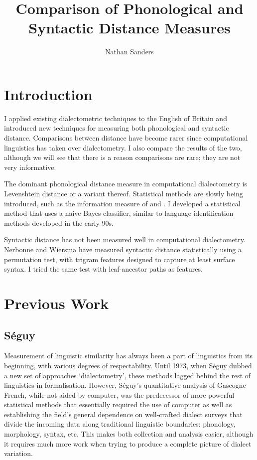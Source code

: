 \documentclass[11pt]{article}
\title{Comparison of Phonological and Syntactic Distance Measures}
\author{Nathan Sanders}
\begin{document}
\maketitle
\section{Introduction}

I applied existing dialectometric techniques to the English of Britain
and introduced new techniques for measuring both phonological and
syntactic distance. Comparisons between distance have become rarer
since computational linguistics has taken over dialectometry. I also
compare the results of the two, although we will see that there is a
reason comparisons are rare; they are not very informative.

The dominant phonological distance measure in computational
dialectometry is Levenshtein distance or a variant
thereof. Statistical methods are slowly being introduced, such as the
information measure of \cite{hinrichs07} and \cite{sanders08}.
I developed a statistical method that uses a naive Bayes
classifier, similar to language identification methods developed in
the early 90s.

Syntactic distance has not been measured well in computational
dialectometry. Nerbonne and Wiersma have measured syntactic distance
statistically using a permutation test, with trigram features designed
to capture at least surface syntax. I tried the same test with
leaf-ancestor paths as features.

\section{Previous Work}
\subsection{S\'eguy}
Measurement of linguistic similarity has always been a part of
linguistics from its beginning, with various degrees of
respectability. Until 1973, when S\'eguy dubbed a new set of
approaches `dialectometry', these methods lagged behind the rest of
linguistics in formalisation. However, S\'eguy's quantitative analysis
of Gascogne French, while not aided by computer, was the predecessor
of more powerful statistical methods that essentially required the use
of computer as well as establishing the field's general dependence on
well-crafted dialect surveys that divide the incoming data along
traditional linguistic boundaries: phonology, morphology, syntax, etc.
This makes both collection and analysis easier, although it requires
much more work when trying to produce a complete picture of dialect
variation.
\end{document}
